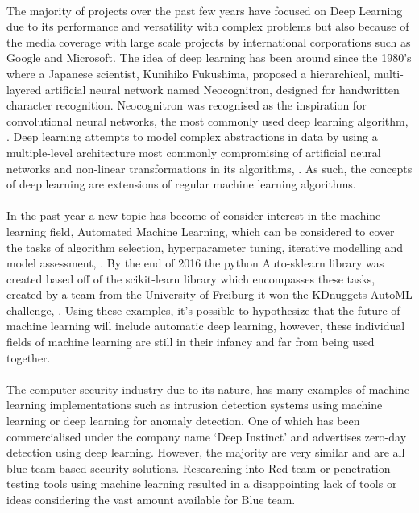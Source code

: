 \paragraph{}The majority of projects over the past few years have focused on Deep Learning due to its performance and versatility with complex problems but also because of the media coverage with large scale projects by international corporations such as Google and Microsoft. The idea of deep learning has been around since the 1980’s where a Japanese scientist, Kunihiko Fukushima, proposed a hierarchical, multi-layered artificial neural network named Neocognitron, designed for handwritten character recognition. Neocognitron was recognised as the inspiration for convolutional neural networks, the most commonly used deep learning algorithm, \cite{DeepLearning}.  Deep learning attempts to model complex abstractions in data by using a multiple-level architecture most commonly compromising of artificial neural networks and non-linear transformations in its algorithms, \cite{CNNperf}.  As such, the concepts of deep learning are extensions of regular machine learning algorithms.
\paragraph{}In the past year a new topic has become of consider interest in the machine learning field, Automated Machine Learning, which can be considered to cover the tasks of algorithm selection, hyperparameter tuning, iterative modelling and model assessment, \cite{autoML}. By the end of 2016 the python Auto-sklearn library was created based off of the scikit-learn library which encompasses these tasks, created by a team from the University of Freiburg it won the KDnuggets AutoML challenge, \cite{auto-skl}. Using these examples, it’s possible to hypothesize that the future of machine learning will include automatic deep learning, however, these individual fields of machine learning are still in their infancy and far from being used together.
\paragraph{}The computer security industry due to its nature, has many examples of machine learning implementations such as intrusion detection systems using machine learning or deep learning for anomaly detection. One of which has been commercialised under the company name ‘Deep Instinct’ and advertises zero-day detection using deep learning. However, the majority are very similar and are all blue team based security solutions. Researching into Red team or penetration testing tools using machine learning resulted in a disappointing lack of tools or ideas considering the vast amount available for Blue team. 
